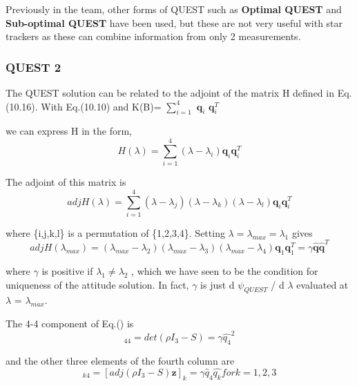 \documentclass[../../main.tex]{subfiles}
\begin{document}
{{{Previously in the team, other forms of QUEST such as \textbf{Optimal QUEST} and \textbf{Sub-optimal QUEST } have been used, but these are not very useful with star trackers as these can combine information from only 2 measurements.

}



\subsubsection{QUEST 2}  %
{
The QUEST solution can be related to the adjoint of the matrix H defined in Eq.(10.16). With Eq.(10.10) and K(B)= $\sum_{i=1}^{4}$ $\mathbf{q}_{i}$ $\mathbf{q}_{i}^{T}$

we can express H in the form,
\begin{equation}
    H(\lambda) = \sum_{i=1}^{4} (\lambda - \lambda_{i}) \textbf{q}_{i} \textbf{q}_{i}^{T}
\end{equation}

The adjoint of this matrix is 
\begin{equation}
   adj H(\lambda)= \sum_{i=1}^{4} (\lambda - \lambda_{j}) (\lambda - \lambda_{k}) (\lambda - \lambda_{l}) \textbf{q}_{i} \textbf{q}_{i}^{T}
\end{equation}

where \{i,j,k,l\} is a permutation of \{1,2,3,4\}. Setting $\lambda = \lambda_{max} = \lambda_{1}$ gives
\begin{equation}
   adj H(\lambda_{max}) = (\lambda_{max} - \lambda_{2}) (\lambda_{max} - \lambda_{3}) (\lambda_{max} - \lambda_{4}) \textbf{q}_{1} \textbf{q}_{1}^{T} = \gamma \hat{\textbf{q}} \hat{\textbf{q}}^{T}
\end{equation}

where $\gamma$ is positive if $\lambda_{1} \ne \lambda_{2}$ , which we have seen to be the condition for uniqueness of the attitude solution. In fact, $\gamma$ is just d $\psi_{QUEST}$ / d $\lambda$ evaluated at $\lambda$ = $\lambda_{max}$.

The 4-4 component of Eq.() is
\begin{equation}
   [adj H(\lambda_{max})]_{44} = det(\rho I_{3} - S) = \gamma \hat{q_{4}}^{2}
\end{equation}

and the other three elements of the fourth column are 
\begin{equation}
   [adj H(\lambda_{max})]_{k4} = [adj(\rho I_{3} - S) \textbf{z}]_{k} = \gamma \hat{q}_{4} \hat{q_{k}}  for  k = 1,2,3
\end{equation}

}}}
\end{document}
